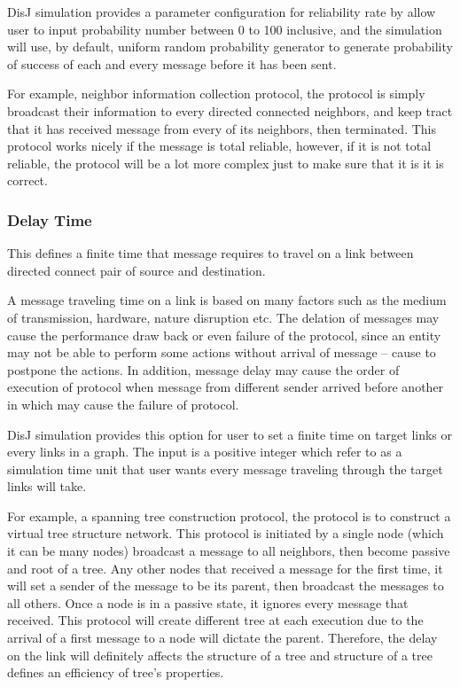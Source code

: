 DisJ simulation provides a parameter configuration for reliability rate by allow user to input probability number between 0 to 100 inclusive, and the simulation will use, by default, uniform random probability generator to generate probability of success of each and every message before it has been sent.

For example, neighbor information collection protocol, the protocol is simply broadcast their information to every directed connected neighbors, and keep tract that it has received message from every of its neighbors, then terminated. This protocol works nicely if the message is total reliable, however, if it is not total reliable, the protocol will be a lot more complex just to make sure that it is it is correct.


\subsubsection*{Delay Time}

This defines a finite time that message requires to travel on a link between directed connect pair of source and destination.

A message traveling time on a link is based on many factors such as the medium of transmission, hardware, nature disruption etc. The delation of messages may cause the performance draw back or even failure of the protocol, since an entity may not be able to perform some actions without arrival of message -- cause to postpone the actions. In addition, message delay may cause the order of execution of protocol when message from different sender arrived before another in which may cause the failure of protocol.

DisJ simulation provides this option for user to set a finite time on target links or every links in a graph. The input is a positive integer which refer to as a simulation time unit that user wants every message traveling through the target links will take.

For example, a spanning tree construction protocol, the protocol is to construct a virtual tree structure network. This protocol is initiated by a single node (which it can be many nodes) broadcast a message to all neighbors, then become passive and root of a tree. Any other nodes that received a message for the first time, it will set a sender of the message to be its parent, then broadcast the messages to all others. Once a node is in a passive state, it ignores every message that received. This protocol will create different tree at each execution due to the arrival of a first message to a node will dictate the parent. Therefore, the delay on the link will definitely affects the structure of a tree and structure of a tree defines an efficiency of tree's properties.


